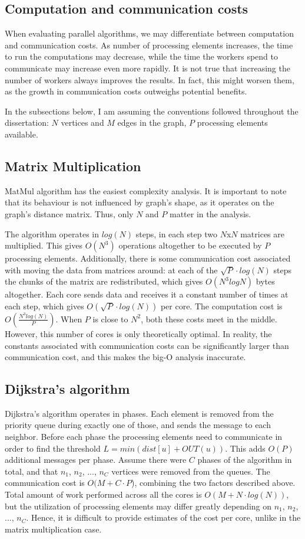 \documentclass[12pt,a4paper,oneside,openright]{report}
\begin{document}
\subsection{Computation and communication costs}
When evaluating parallel algorithms, we may differentiate between computation and communication costs. As number of processing elements increases, the time to run the computations may decrease, while the time the workers spend to communicate may increase even more rapidly. It is not true that increasing the number of workers always improves the results. In fact, this might worsen them, as the growth in communication costs outweighs potential benefits.

In the subsections below, I am assuming the conventions followed throughout the dissertation: $N$ vertices and $M$ edges in the graph, $P$ processing elements available. 

\subsection{Matrix Multiplication}
MatMul algorithm has the easiest complexity analysis. It is important to note that its behaviour is not influenced by graph's shape, as it operates on the graph's distance matrix. Thus, only $N$ and $P$ matter in the analysis.

The algorithm operates in $log(N)$ steps, in each step two $N$x$N$ matrices are multiplied. This gives $O(N^3)$ operations altogether to be executed by $P$ processing elements. Additionally, there is some communication cost associated with moving the data from matrices around: at each of the $\sqrt{P} \cdot log(N)$ steps the chunks of the matrix are redistributed, which gives $O(N^3 log N)$ bytes altogether. Each core sends data and receives it a constant number of times at each step, which gives $O(\sqrt{P}\cdot log(N))$ per core. The computation cost is $O(\frac{N^3 log(N)}{P})$. When $P$ is close to $N^2$, both these costs meet in the middle. However, this number of cores is only theoretically optimal. In reality, the constants associated with communication costs can be significantly larger than communication cost, and this makes the big-O analysis inaccurate.

\subsection{Dijkstra's algorithm}
Dijkstra's algorithm operates in phases. Each element is removed from the priority queue during exactly one of those, and sends the message to each neighbor. Before each phase the processing elements need to communicate in order to find the threshold $L = min(dist[u] + OUT(u))$. This adds $O(P)$ additional messages per phase. Assume there were $C$ phases of the algorithm in total, and that $n_1$, $n_2$, ..., $n_C$ vertices were removed from the queues. The communication cost is $O(M + C\cdot P$), combining the two factors described above. Total amount of work performed across all the cores is $O(M + N\cdot log(N))$, but the utilization of processing elements may differ greatly depending on $n_1$, $n_2$, ..., $n_C$. Hence, it is difficult to provide estimates of the cost per core, unlike in the matrix multiplication case. 
\end{document}
